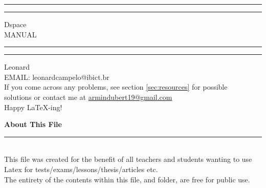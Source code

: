 \documentclass[12pt,hidelinks]{article}
\begin{document}
\begin{titlepage}
	\centering %
	\scshape %
	\vspace*{1.5\baselineskip} %

	\rule{13cm}{1.6pt}\vspace*{-\baselineskip}\vspace*{2pt} %
	\rule{13cm}{0.4pt} %
	
		\vspace{0.75\baselineskip} %
	{	\Huge Dspace\\ 
			\vspace{4mm}
		MANUAL  \\	}
		\vspace{0.75\baselineskip} %
	\rule{13cm}{0.4pt}\vspace*{-\baselineskip}\vspace{3.2pt} %
	\rule{13cm}{1.6pt} %
	
		\vspace{1.75\baselineskip} %
	{\large Leonard \\
		\vspace*{1.2\baselineskip}
	EMAIL: leonardcampelo@ibict.br} \\
	\vfill
If you come across any problems, see section \ref{sec:resources} for possible\\ \vspace{1mm}
solutions or contact me at \url{armindubert19@gmail.com}\\ \vspace{1mm}
Happy \LaTeX-ing!
\end{titlepage}
\tableofcontents
\vfill
\small{\noindent \textbf{About This File} \vspace{-3mm}\\
\noindent \rule{3.3cm}{0.5pt} \\
This file was created for the benefit of all teachers and students wanting to use Latex for tests/exams/lessons/thesis/articles etc.\\
The entirety of the contents within this file, and folder, are free for public use.}
\newpage
{}
\end{document}
